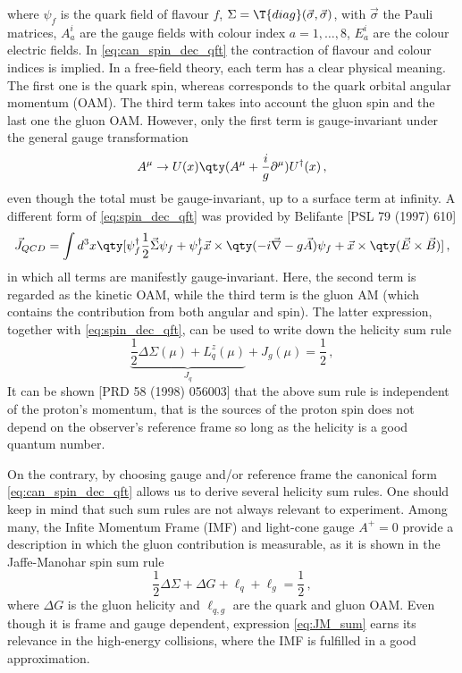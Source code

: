 where $\psi_{f}$ is the quark field of flavour $f$, $\Sigma = \T{diag} (\vec{\sigma}, \vec{\sigma})$, with $\vec{\sigma}$ the Pauli matrices, $A_{a}^{i}$ are the gauge fields with colour index $a=1,\dots,8$, $E_{a}^{i}$ are the colour electric fields. In \eqref{eq:can_spin_dec_qft} the contraction of flavour and colour indices is implied. In a free-field theory, each term has a clear physical meaning. The first one is the quark spin, whereas corresponds to the quark orbital angular momentum (OAM). The third term takes into account the gluon spin and the last one the gluon OAM. However, only the first term is gauge-invariant under the general gauge transformation 
\begin{equation}
    A^{\mu} \rightarrow U(x) \qty( A^{\mu} + \frac{i}{g}\partial^{\mu} ) U^{\dag}(x)\,,
\end{equation}
even though the total must be gauge-invariant, up to a surface term at infinity. A different form of \eqref{eq:spin_dec_qft} was provided by Belifante [PSL 79 (1997) 610] 
\begin{equation}
    \vec{J}_{QCD} = \int d^3 x \qty [ \psi^{\dag}_{f} \frac{1}{2} \vec{\Sigma} \psi_{f} +  \psi^{\dag}_{f} \vec{x} \times \qty(-i \vec{\nabla} - g \vec{A}) \psi_{f} + \vec{x} \times \qty( \vec{E} \times \vec{B} ) ] \,,
    \label{eq:spin_dec_qft}
\end{equation}
in which all terms are manifestly gauge-invariant. Here, the second term is regarded as the kinetic OAM, while the third term is the gluon AM (which contains the contribution from both angular and spin). The latter expression, together with \eqref{eq:spin_dec_qft}, can be used to write down the helicity sum rule
\begin{equation}
    \underbrace{\frac{1}{2} \Delta \Sigma (\mu) + L_{q}^{z} (\mu)}_{J_{q}} + J_{g} (\mu) = \frac{1}{2} \,,
\end{equation}
It can be shown [PRD 58 (1998) 056003] that the above sum rule is independent of the proton's momentum, that is the sources of the proton spin does not depend on the observer's reference frame so long as the helicity is a good quantum number.\par
On the contrary, by choosing gauge and/or reference frame the canonical form \eqref{eq:can_spin_dec_qft} allows us to derive several helicity sum rules. One should keep in mind that such sum rules are not always relevant to experiment. Among many, the Infite Momentum Frame (IMF) and light-cone gauge $A^+ = 0$ provide a description in which the gluon contribution is measurable, as it is shown in the Jaffe-Manohar spin sum rule
\begin{equation}
    \frac{1}{2} \Delta \Sigma + \Delta G + \ell_{q} + \ell_{g} = \frac{1}{2}\,,
    \label{eq:JM_sum}
\end{equation}
where $\Delta G$ is the gluon helicity and $\ell_{q,g}$ are the quark and gluon OAM. Even though it is frame and gauge dependent, expression \eqref{eq:JM_sum} earns its relevance in the high-energy collisions, where the IMF is fulfilled in a good approximation.
